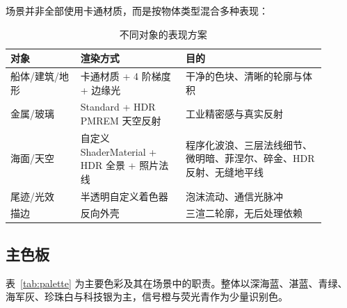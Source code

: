 \documentclass[UTF8, a4paper, 11pt]{ctexart}
\begin{document}
场景并非全部使用卡通材质，而是按物体类型混合多种表现：

\begin{table}[H]
\centering
\caption{不同对象的表现方案}
\label{tab:art}
\small
\begin{tabular}{@{}p{0.20\linewidth}p{0.30\linewidth}p{0.40\linewidth}@{}}
\toprule
\textbf{对象} & \textbf{渲染方式} & \textbf{目的} \\
\midrule
船体/建筑/地形 & 卡通材质 + 4 阶梯度 + 边缘光 & 干净的色块、清晰的轮廓与体积 \\
金属/玻璃 & Standard + HDR PMREM 天空反射 & 工业精密感与真实反射 \\
海面/天空 & 自定义 ShaderMaterial + HDR 全景 + 照片法线 & 程序化波浪、三层法线细节、微明暗、菲涅尔、碎金、HDR 反射、无缝地平线 \\
尾迹/光效 & 半透明自定义着色器 & 泡沫流动、通信光脉冲 \\
描边 & 反向外壳 & 三渲二轮廓，无后处理依赖 \\
\bottomrule
\end{tabular}
\end{table}

\subsection{主色板}

表~\ref{tab:palette} 为主要色彩及其在场景中的职责。整体以深海蓝、湛蓝、青绿、海军灰、珍珠白与科技银为主，信号橙与荧光青作为少量识别色。
\end{document}
